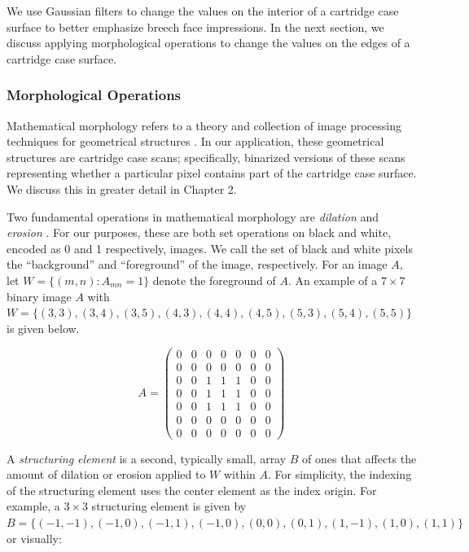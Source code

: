 \documentclass[11pt,]{isuthesis}
\begin{document}
We use Gaussian filters to change the values on the interior of a cartridge case surface to better emphasize breech face impressions.
In the next section, we discuss applying morphological operations to change the values on the edges of a cartridge case surface.

\hypertarget{morphological-operations}{%
\subsubsection{Morphological Operations}\label{morphological-operations}}

Mathematical morphology refers to a theory and collection of image processing techniques for geometrical structures \citep{Haralick1987}.
In our application, these geometrical structures are cartridge case scans; specifically, binarized versions of these scans representing whether a particular pixel contains part of the cartridge case surface.
We discuss this in greater detail in Chapter 2.

Two fundamental operations in mathematical morphology are \emph{dilation} and \emph{erosion} \citep{Haralick1987}.
For our purposes, these are both set operations on black and white, encoded as 0 and 1 respectively, images.
We call the set of black and white pixels the ``background'' and ``foreground'' of the image, respectively.
For an image \(A\), let \(W = \{(m,n) : A_{mn} = 1\}\) denote the foreground of \(A\).
An example of a \(7 \times 7\) binary image \(A\) with \(W = \{(3,3),(3,4),(3,5),(4,3),(4,4),(4,5),(5,3),(5,4),(5,5)\}\) is given below.

\[
A = 
\begin{pmatrix}
0 & 0 & 0 & 0 & 0 & 0 & 0 \\
0 & 0 & 0 & 0 & 0 & 0 & 0 \\
0 & 0 & 1 & 1 & 1 & 0 & 0 \\
0 & 0 & 1 & 1 & 1 & 0 & 0 \\
0 & 0 & 1 & 1 & 1 & 0 & 0 \\
0 & 0 & 0 & 0 & 0 & 0 & 0 \\
0 & 0 & 0 & 0 & 0 & 0 & 0
\end{pmatrix}
\]

A \emph{structuring element} is a second, typically small, array \(B\) of ones that affects the amount of dilation or erosion applied to \(W\) within \(A\).
For simplicity, the indexing of the structuring element uses the center element as the index origin.
For example, a \(3 \times 3\) structuring element is given by \(B = \{(-1,-1),(-1,0),(-1,1),(-1,0),(0,0),(0,1),(1,-1),(1,0),(1,1)\}\) or visually:
\end{document}
